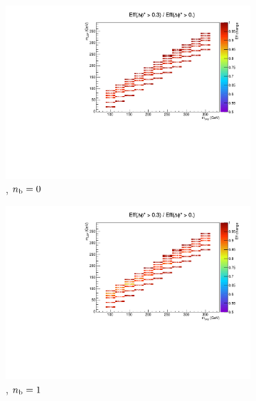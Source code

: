\begin{figure}[h!]
  \centering
  \begin{subfigure}[b]{0.46\textwidth}
    \includegraphics[width=\textwidth]
    {Figs/sms/t2cc/v37/eff_changes/eff_compare_2d_T2cc_v37_vs_T2cc_v38_eq0b_le3j}
    \caption{\njlow, $n_{\text{b}} = 0$}
    \label{fig:t2cc_dphistar_eq0b_le3j}
  \end{subfigure}
  \begin{subfigure}[b]{0.46\textwidth}
    \includegraphics[width=\textwidth]
    {Figs/sms/t2cc/v37/eff_changes/eff_compare_2d_T2cc_v37_vs_T2cc_v38_eq1b_le3j}
    \caption{\njlow, $n_{\text{b}} = 1$}
    \label{fig:t2cc_dphistar_eq1b_le3j}
  \end{subfigure}\\
  \vspace{0.2cm}
  \begin{subfigure}[b]{0.46\textwidth}

\end{subfigure}
\end{figure}
